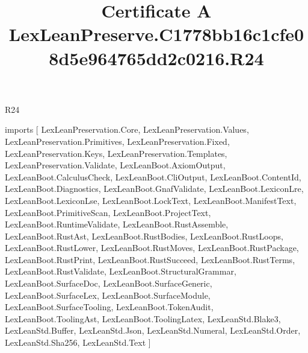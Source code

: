 \begin{lexlean}{R24}
\title{Certificate A LexLeanPreserve.C1778bb16c1cfe08d5e964765dd2c0216.R24}
\begin{coremodule}
imports [
  LexLeanPreservation.Core,
  LexLeanPreservation.Values,
  LexLeanPreservation.Primitives,
  LexLeanPreservation.Fixed,
  LexLeanPreservation.Keys,
  LexLeanPreservation.Templates,
  LexLeanPreservation.Validate,
  LexLeanBoot.AxiomOutput,
  LexLeanBoot.CalculusCheck,
  LexLeanBoot.CliOutput,
  LexLeanBoot.ContentId,
  LexLeanBoot.Diagnostics,
  LexLeanBoot.GnafValidate,
  LexLeanBoot.LexiconLre,
  LexLeanBoot.LexiconLse,
  LexLeanBoot.LockText,
  LexLeanBoot.ManifestText,
  LexLeanBoot.PrimitiveScan,
  LexLeanBoot.ProjectText,
  LexLeanBoot.RuntimeValidate,
  LexLeanBoot.RustAssemble,
  LexLeanBoot.RustAst,
  LexLeanBoot.RustBodies,
  LexLeanBoot.RustLoops,
  LexLeanBoot.RustLower,
  LexLeanBoot.RustMoves,
  LexLeanBoot.RustPackage,
  LexLeanBoot.RustPrint,
  LexLeanBoot.RustSucceed,
  LexLeanBoot.RustTerms,
  LexLeanBoot.RustValidate,
  LexLeanBoot.StructuralGrammar,
  LexLeanBoot.SurfaceDoc,
  LexLeanBoot.SurfaceGeneric,
  LexLeanBoot.SurfaceLex,
  LexLeanBoot.SurfaceModule,
  LexLeanBoot.SurfaceTooling,
  LexLeanBoot.TokenAudit,
  LexLeanBoot.ToolingAst,
  LexLeanBoot.ToolingLatex,
  LexLeanStd.Blake3,
  LexLeanStd.Buffer,
  LexLeanStd.Json,
  LexLeanStd.Numeral,
  LexLeanStd.Order,
  LexLeanStd.Sha256,
  LexLeanStd.Text
]


\end{coremodule}
\end{lexlean}
